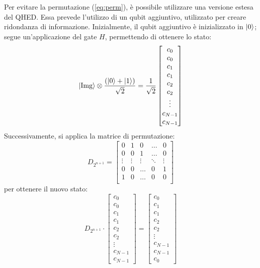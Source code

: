 Per evitare la permutazione (\ref{eq:perm}), è possibile utilizzare una
versione estesa del QHED. Essa prevede l'utilizzo di un qubit aggiuntivo,
utilizzato per creare ridondanza di informazione. Inizialmente, il qubit
aggiuntivo è inizializzato in $\lvert0\rangle$; segue un'applicazione del gate $H$,
permettendo di ottenere lo stato:
\begin{equation}
	\lvert\text{Img}\rangle \otimes 
		\frac{(\lvert0\rangle + \lvert1\rangle)}{\sqrt 2} =
		\frac{1}{\sqrt 2} \begin{bmatrix}
			c_0\\c_0\\c_1\\c_1\\c_2\\c_2\\\vdots\\c_{N-1}\\c_{N-1}
		\end{bmatrix}
\end{equation}
Successivamente, si applica la matrice di permutazione:
\begin{equation}
	D_{2^{n+1}} = \begin{bmatrix}
		0 & 1 & 0 &\ldots& 0 \\
		0 & 0 & 1 &\ldots& 0 \\
		\vdots & \vdots & \vdots & \ddots & \vdots \\
		0 & 0 &\ldots & 0 & 1\\
		1 & 0 &\ldots & 0 & 0\\
	\end{bmatrix}
	\label{eq:eq-perm-matrix}
\end{equation}
per ottenere il nuovo stato:
\begin{equation}
	D_{2^{n+1}} \cdot \begin{bmatrix}
		c_0\\c_0\\c_1\\c_1\\c_2\\c_2\\\vdots\\c_{N-1}\\c_{N-1}
	\end{bmatrix} = \begin{bmatrix}
		c_0\\c_1\\c_1\\c_2\\c_2\\\vdots\\c_{N-1}\\c_{N-1}\\c_0
	\end{bmatrix}
	\label{eq:perm-state}
\end{equation}
